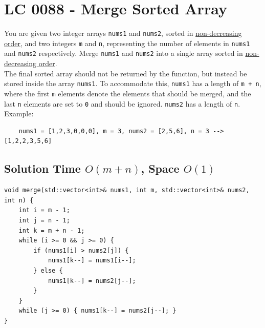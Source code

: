 \section{LC 0088 - Merge Sorted Array}\label{lc0088}
You are given two integer arrays {\colorbox{CodeBackground}{\lstinline|nums1|}} and {\colorbox{CodeBackground}{\lstinline|nums2|}}, sorted in \ul{non-decreasing order}, and two integers {\colorbox{CodeBackground}{\lstinline|m|}} and {\colorbox{CodeBackground}{\lstinline|n|}}, representing the number of elements in {\colorbox{CodeBackground}{\lstinline|nums1|}} and {\colorbox{CodeBackground}{\lstinline|nums2|}} respectively. Merge {\colorbox{CodeBackground}{\lstinline|nums1|}} and {\colorbox{CodeBackground}{\lstinline|nums2|}} into a single array sorted in \ul{non-decreasing order}.\\

The final sorted array should not be returned by the function, but instead be stored inside the array {\colorbox{CodeBackground}{\lstinline|nums1|}}. To accommodate this, {\colorbox{CodeBackground}{\lstinline|nums1|}} has a length of {\colorbox{CodeBackground}{\lstinline|m + n|}}, where the first {\colorbox{CodeBackground}{\lstinline|m|}} elements denote the elements that should be merged, and the last {\colorbox{CodeBackground}{\lstinline|n|}} elements are set to {\colorbox{CodeBackground}{\lstinline|0|}} and should be ignored. {\colorbox{CodeBackground}{\lstinline|nums2|}} has a length of {\colorbox{CodeBackground}{\lstinline|n|}}.\\

Example:
\begin{lstlisting}
	nums1 = [1,2,3,0,0,0], m = 3, nums2 = [2,5,6], n = 3 --> [1,2,2,3,5,6]
\end{lstlisting}

\subsection*{Solution {\scriptsize\color{gray}\Coffeecup\hspace{1mm}Time $O(m + n)$, Space $O(1)$}}
\begin{lstlisting}
void merge(std::vector<int>& nums1, int m, std::vector<int>& nums2, int n) {
	int i = m - 1;
	int j = n - 1;
	int k = m + n - 1;
	while (i >= 0 && j >= 0) {
		if (nums1[i] > nums2[j]) {
			nums1[k--] = nums1[i--];
		} else {
			nums1[k--] = nums2[j--];
		}
	}
	while (j >= 0) { nums1[k--] = nums2[j--]; }
}
\end{lstlisting}

